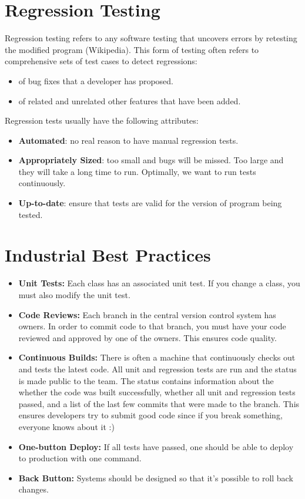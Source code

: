 \documentclass[11pt]{article}
\begin{document}
\section*{Regression Testing}

Regression testing refers to any software testing that uncovers errors by retesting the modified program (Wikipedia). This form of testing often refers to comprehensive sets of test cases to detect regressions:
\begin{itemize}[noitemsep]
\item of bug fixes that a developer has proposed.
\item of related and unrelated other features that have been added.
\end{itemize}

Regression tests usually have the following attributes:

\begin{itemize}[noitemsep]
\item \textbf{Automated}: no real reason to have manual regression tests.
\item \textbf{Appropriately Sized}: too small and bugs will be missed. Too large and they will take a long time to run. Optimally, we want to run tests continuously.
\item \textbf{Up-to-date}: ensure that tests are valid for the version of program being tested.
\end{itemize}

\section*{Industrial Best Practices}

\begin{itemize}[noitemsep]

\item \textbf{Unit Tests:} Each class has an associated unit test. If you change a class, you must also modify the unit test.

\item \textbf{Code Reviews:} Each branch in the central version control system has owners. In order to commit code to that branch, you must have your code reviewed and approved by one of the owners. This ensures code quality.

\item \textbf{Continuous Builds:} There is often a machine that continuously checks out and tests the latest code. All unit and regression tests are run and the status is made public to the team. The status contains information about the whether the code was built successfully, whether all unit and regression tests passed, and a list of the last few commits that were made to the branch. This ensures developers try to submit good code since if you break something, everyone knows about it :)

\item \textbf{One-button Deploy:} If all tests have passed, one should be able to deploy to production
with one command.

\item \textbf{Back Button:} Systems should be designed so that it's possible to roll back changes.
\end{itemize}
\end{document}
